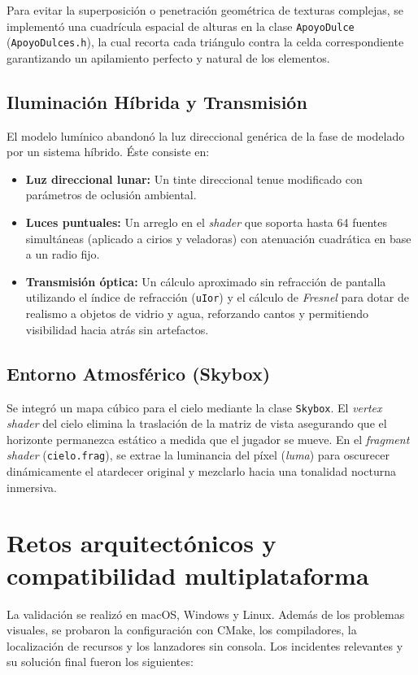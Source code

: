 \documentclass[letter,11pt]{article}
\begin{document}
	Para evitar la superposición o penetración geométrica de texturas complejas, se implementó una cuadrícula espacial de alturas en la clase \texttt{ApoyoDulce} (\texttt{ApoyoDulces.h}), la cual recorta cada triángulo contra la celda correspondiente garantizando un apilamiento perfecto y natural de los elementos.
	
	\subsection{Iluminación Híbrida y Transmisión}
	El modelo lumínico abandonó la luz direccional genérica de la fase de modelado por un sistema híbrido. Éste consiste en:
	\begin{itemize}[leftmargin=*]
		\item \textbf{Luz direccional lunar:} Un tinte direccional tenue modificado con parámetros de oclusión ambiental.
		\item \textbf{Luces puntuales:} Un arreglo en el \textit{shader} que soporta hasta 64 fuentes simultáneas (aplicado a cirios y veladoras) con atenuación cuadrática en base a un radio fijo.
		\item \textbf{Transmisión óptica:} Un cálculo aproximado sin refracción de pantalla utilizando el índice de refracción (\texttt{uIor}) y el cálculo de \textit{Fresnel} para dotar de realismo a objetos de vidrio y agua, reforzando cantos y permitiendo visibilidad hacia atrás sin artefactos.
	\end{itemize}
	
	\subsection{Entorno Atmosférico (Skybox)}
	Se integró un mapa cúbico para el cielo mediante la clase \texttt{Skybox}. El \textit{vertex shader} del cielo elimina la traslación de la matriz de vista asegurando que el horizonte permanezca estático a medida que el jugador se mueve. En el \textit{fragment shader} (\texttt{cielo.frag}), se extrae la luminancia del píxel (\textit{luma}) para oscurecer dinámicamente el atardecer original y mezclarlo hacia una tonalidad nocturna inmersiva.
	
	\section{Retos arquitectónicos y compatibilidad multiplataforma}
	La validación se realizó en macOS, Windows y Linux. Además de los problemas visuales, se probaron la configuración con CMake, los compiladores, la localización de recursos y los lanzadores sin consola. Los incidentes relevantes y su solución final fueron los siguientes:
	
\end{document}
